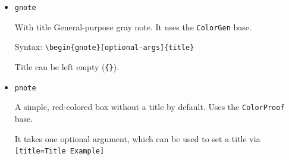 \documentclass[a4paper,12pt]{report}
\begin{document}
\begin{itemize}
    \item \texttt{gnote}
        \begin{gnote}{With title}
            General-purpose gray note. It uses the \texttt{ColorGen} base.

            Syntax: \texttt{\textbackslash begin\{gnote\}[optional-args]\{title\}}
        \end{gnote}

        \begin{gnote}{}
            Title can be left empty (\texttt{\{\}}).
        \end{gnote}

    \item \texttt{pnote}
        \begin{pnote}
            A simple, red-colored box without a title by default. Uses the \texttt{ColorProof} base.
        \end{pnote}

        \begin{pnote}[title=Title Example]
            It takes one optional argument, which can be used to set a title via \texttt{[title=Title Example]}
        \end{pnote}
\end{itemize}
\end{document}
